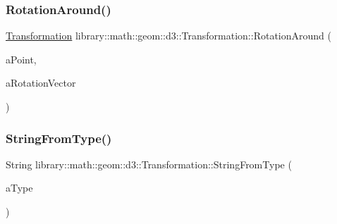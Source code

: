 \mbox{\label{classlibrary_1_1math_1_1geom_1_1d3_1_1_transformation_a11d93f665adb24cc4fdf2244c8509082}} 
\subsubsection{\texorpdfstring{Rotation\+Around()}{RotationAround()}}
{\footnotesize\ttfamily \hyperlink{classlibrary_1_1math_1_1geom_1_1d3_1_1_transformation}{Transformation} library\+::math\+::geom\+::d3\+::\+Transformation\+::\+Rotation\+Around (\begin{DoxyParamCaption}\item[{const \hyperlink{classlibrary_1_1math_1_1geom_1_1d3_1_1objects_1_1_point}{Point} \&}]{a\+Point,  }\item[{const \hyperlink{classlibrary_1_1math_1_1geom_1_1d3_1_1trf_1_1rot_1_1_rotation_vector}{Rotation\+Vector} \&}]{a\+Rotation\+Vector }\end{DoxyParamCaption})\hspace{0.3cm}{\ttfamily [static]}}

\mbox{\label{classlibrary_1_1math_1_1geom_1_1d3_1_1_transformation_a9511c7844b5b8af0c8c7ad97454a5a96}} 
\subsubsection{\texorpdfstring{String\+From\+Type()}{StringFromType()}}
{\footnotesize\ttfamily String library\+::math\+::geom\+::d3\+::\+Transformation\+::\+String\+From\+Type (\begin{DoxyParamCaption}\item[{const \hyperlink{classlibrary_1_1math_1_1geom_1_1d3_1_1_transformation_a25f1dc99d391174bf82a7132d08b2fc1}{Transformation\+::\+Type} \&}]{a\+Type }\end{DoxyParamCaption})\hspace{0.3cm}{\ttfamily [static]}}

